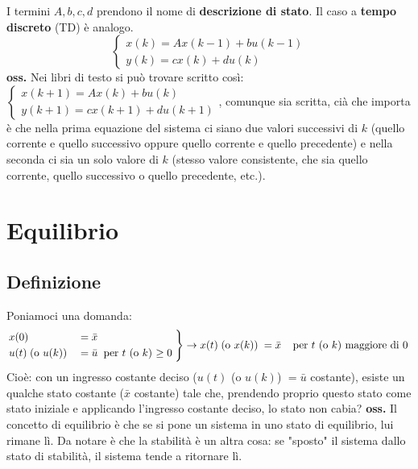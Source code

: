 I termini $A, b, c, d$ prendono il nome di \textbf{descrizione di stato}.\newline
\newline
Il caso a \textbf{tempo discreto} (TD) è analogo.
\[
    \begin{cases}
        x(k) = Ax(k-1) + bu(k-1)\\
        y(k) = cx(k) +d u(k)
    \end{cases}
\] 
\textbf{oss.} Nei libri di testo si può trovare scritto così: $\begin{cases}
    x(k+1) = Ax(k) + bu(k)\\
    y(k+1) = cx(k+1) +d u(k+1)
\end{cases}$, comunque sia scritta, cià che importa è che nella prima equazione del sistema ci siano due valori successivi di $k$ (quello corrente e quello successivo oppure quello corrente e quello precedente) e nella seconda ci sia un solo valore di $k$ (stesso valore consistente, che sia quello corrente, quello successivo o quello precedente, etc.).
\newpage
\section{Equilibrio}
\subsection{Definizione}
Poniamoci una domanda:
\[
    \begin{rcases}
        x(0) &= \bar{x}\\
        u(t) \;\text{(o $u(k)$)}\; &= \bar{u} \;\;\text{per $t$ (o $k$) $\geq 0$}\;
    \end{rcases} \rightarrow x(t) \;\text{(o $x(k)$)}\; = \bar{x} \;\;\;\;\text{per $t$ (o $k$) maggiore di 0}\;
\]
Cioè: con un ingresso costante deciso ($u(t)$ (o $u(k)$) $=\bar{u}$ costante), esiste un qualche stato costante ($\bar{x}$ costante) tale che, prendendo proprio questo stato come stato iniziale e applicando l'ingresso costante deciso, lo stato non cabia?\newline
\newline
\textbf{oss.} Il concetto di equilibrio è che se si pone un sistema in uno stato di equilibrio, lui rimane lì. Da notare è che la stabilità è un altra cosa: se "sposto" il sistema dallo stato di stabilità, il sistema tende a ritornare lì.
